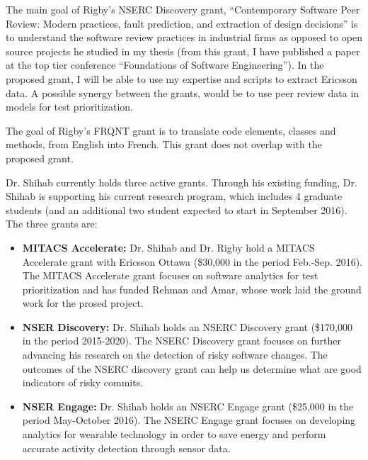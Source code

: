 \documentclass[12pt, letterpaper]{article}
\begin{document}
\fancyhead{}
\pagestyle{fancy}
\renewcommand{\headrulewidth}{0pt}

\begin{center}
\begin{LARGE}
\noindent
{}
\end{LARGE}
\end{center}


The main goal of Rigby's NSERC Discovery grant, “Contemporary Software Peer Review:
Modern practices, fault prediction, and extraction of design decisions” is to
understand the software review practices in industrial firms as opposed to open
source projects he studied in my thesis (from this grant, I have published a
paper at the top tier conference “Foundations of Software Engineering”). 
%
In the proposed grant, I will be able to use my expertise and scripts to
extract Ericsson data. A possible synergy between the grants, would be to use
peer review data in models for test prioritization. 

The goal of Rigby's FRQNT grant is to translate code elements, classes and methods,
from English into French. This grant does not overlap with the proposed grant.

Dr. Shihab currently holds three active grants. Through his existing funding, Dr. Shihab is supporting his current research program, which includes 4 graduate students (and an additional two student expected to start in September 2016). The three grants are:

\begin{itemize}

\item{\textbf{MITACS Accelerate:}} Dr. Shihab and Dr. Rigby hold a MITACS Accelerate grant with Ericsson Ottawa (\$30,000 in the period Feb.-Sep. 2016). The MITACS Accelerate grant focuses on software analytics for test prioritization and has funded Rehman and Amar, whose work laid the ground work for the prosed project.

\item{\textbf{NSER Discovery:}} Dr. Shihab holds an NSERC Discovery grant (\$170,000 in the period 2015-2020). The NSERC Discovery grant focuses on further advancing his research on the detection of risky software changes. The outcomes of the NSERC discovery grant can help us determine what are good indicators of risky commits.

\item{\textbf{NSER Engage:}} Dr. Shihab holds an NSERC Engage grant (\$25,000 in the period May-October 2016). The NSERC Engage grant focuses on developing analytics for wearable technology in order to save energy and perform accurate activity detection through sensor data.
\end{itemize}
\end{document}
